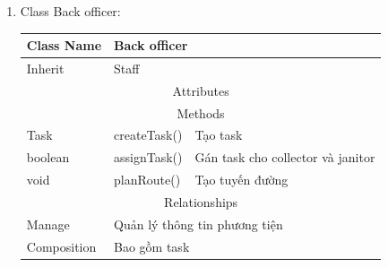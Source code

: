 \begin{enumerate}
        \item Class Back officer:
        \begin{table}[htp]
            \begin{tabular}{|lll|}
                \hline
                \multicolumn{1}{|l|}{Class Name}  & \multicolumn{2}{l|}{Back officer}                                     \\ \hline
                \multicolumn{1}{|l|}{Inherit}     & \multicolumn{2}{l|}{Staff}                                            \\ \hline
                \multicolumn{3}{|c|}{\cellcolor[HTML]{FFFFC7}Attributes}                                                  \\ \hline
                \multicolumn{3}{|c|}{\cellcolor[HTML]{FFFFC7}Methods}                                                     \\ \hline
                \multicolumn{1}{|l|}{Task}        & \multicolumn{1}{l|}{createTask()} & Tạo task                          \\ \hline
                \multicolumn{1}{|l|}{boolean}     & \multicolumn{1}{l|}{assignTask()} & Gán task cho collector và janitor \\ \hline
                \multicolumn{1}{|l|}{void}        & \multicolumn{1}{l|}{planRoute()}  & Tạo tuyến đường                   \\ \hline
                \multicolumn{3}{|c|}{\cellcolor[HTML]{FFFFC7}Relationships}                                               \\ \hline
                \multicolumn{1}{|l|}{Manage}      & \multicolumn{2}{l|}{Quản lý thông tin phương tiện}                    \\ \hline
                \multicolumn{1}{|l|}{Composition} & \multicolumn{2}{l|}{Bao gồm task}                                     \\ \hline
            \end{tabular}
        \end{table}
   
        \newpage
           

\end{enumerate}
